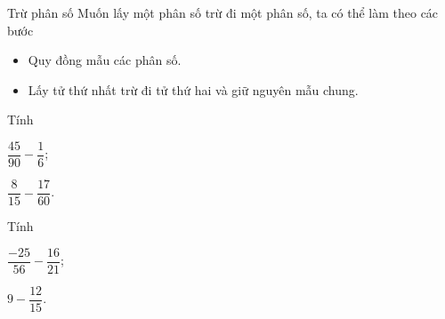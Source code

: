 \begin{dang}{Trừ phân số}
	Muốn lấy một phân số trừ đi một phân số, ta có thể làm theo các bước
	\begin{itemize}
		\item Quy đồng mẫu các phân số.
		\item Lấy tử thứ nhất trừ đi tử thứ hai và giữ nguyên mẫu chung.
	\end{itemize}
\end{dang}
\begin{vd}%
	Tính
	\begin{enumEX}{2}
		\item $\dfrac{45}{90}-\dfrac{1}{6}$;
		\item $\dfrac{8}{15}-\dfrac{17}{60}$.
		\end{enumEX}
\end{vd}
\begin{vd}%
	Tính 
	\begin{enumEX}{2}
		\item $\dfrac{-25}{56}-\dfrac{16}{21}$;
		\item $9-\dfrac{12}{15}$.
		\end{enumEX}
\end{vd}

